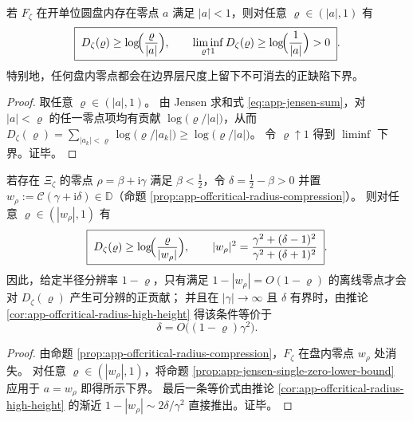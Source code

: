 \begin{proposition}\label{prop:app-jensen-single-zero-lower-bound}
若 \(F_{\zeta}\) 在开单位圆盘内存在零点 \(a\) 满足 \(|a|<1\)，则对任意 \(\varrho\in(|a|,1)\) 有
\begin{equation}\label{eq:app-jensen-single-zero-lower-bound}
\boxed{\;
D_{\zeta}(\varrho)\ge \log\!\Bigl(\frac{\varrho}{|a|}\Bigr),
\qquad
\liminf_{\varrho\uparrow 1}D_{\zeta}(\varrho)\ge \log\!\Bigl(\frac{1}{|a|}\Bigr)>0\; }.
\end{equation}
特别地，任何盘内零点都会在边界层尺度上留下不可消去的正缺陷下界。
\end{proposition}
\begin{proof}
取任意 \(\varrho\in(|a|,1)\)。
由 Jensen 求和式 \eqref{eq:app-jensen-sum}，对 \(|a|<\varrho\) 的任一零点项均有贡献
\(
\log\bigl(\varrho/|a|\bigr)
\)，从而
\(
D_{\zeta}(\varrho)=\sum_{|a_k|<\varrho}\log\bigl(\varrho/|a_k|\bigr)\ge \log\bigl(\varrho/|a|\bigr)
\)。
令 \(\varrho\uparrow 1\) 得到 \(\liminf\) 下界。证毕。
\end{proof}

\begin{corollary}[离临界线零点的圆盘可见阈值]\label{cor:app-jensen-visible-threshold-offcritical}
若存在 \(\Xi_{\zeta}\) 的零点 \(\rho=\beta+\mathrm{i}\gamma\) 满足 \(\beta<\tfrac12\)，令 \(\delta=\tfrac12-\beta>0\) 并置
\(
w_{\rho}:=\mathcal{C}(\gamma+\mathrm{i}\delta)\in\mathbb{D}
\)（命题 \ref{prop:app-offcritical-radius-compression}）。
则对任意 \(\varrho\in(|w_{\rho}|,1)\) 有
\[
\boxed{\;
D_{\zeta}(\varrho)\ge \log\!\Bigl(\frac{\varrho}{|w_{\rho}|}\Bigr),
\qquad
|w_{\rho}|^{2}=\frac{\gamma^{2}+(\delta-1)^{2}}{\gamma^{2}+(\delta+1)^{2}}\; }.
\]
因此，给定半径分辨率 \(1-\varrho\)，只有满足 \(1-|w_{\rho}|=O(1-\varrho)\) 的离线零点才会对 \(D_{\zeta}(\varrho)\) 产生可分辨的正贡献；
并且在 \(|\gamma|\to\infty\) 且 \(\delta\) 有界时，由推论 \ref{cor:app-offcritical-radius-high-height} 得该条件等价于
\[
\delta=O\bigl((1-\varrho)\gamma^{2}\bigr).
\]
\end{corollary}
\begin{proof}
由命题 \ref{prop:app-offcritical-radius-compression}，\(F_{\zeta}\) 在盘内零点 \(w_{\rho}\) 处消失。
对任意 \(\varrho\in(|w_{\rho}|,1)\)，将命题 \ref{prop:app-jensen-single-zero-lower-bound} 应用于 \(a=w_{\rho}\) 即得所示下界。
最后一条等价式由推论 \ref{cor:app-offcritical-radius-high-height} 的渐近 \(1-|w_{\rho}|\sim 2\delta/\gamma^{2}\) 直接推出。证毕。
\end{proof}

